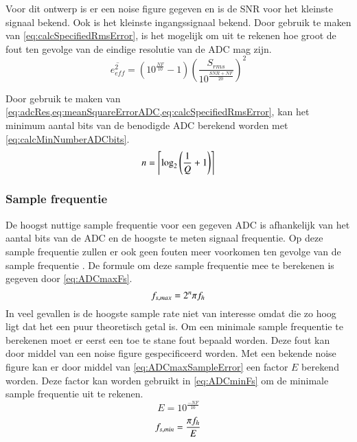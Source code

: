 Voor dit ontwerp is er een noise figure gegeven en is de SNR voor het kleinste signaal bekend. Ook is het kleinste ingangssignaal bekend. Door gebruik te maken van \cref{eq:calcSpecifiedRmsError}, is het mogelijk om uit te rekenen hoe groot de fout ten gevolge van de eindige resolutie van de ADC mag zijn.
\begin{equation}\label{eq:calcSpecifiedRmsError}
    \overline{e_{eff}^2}=\left(10^{\frac{NF}{10}}-1\right)\left(\frac{S_{rms}}{10^{\frac{SNR+NF}{20}}}\right)^2
\end{equation}

Door gebruik te maken van \cref{eq:adcRes,eq:meanSquareErrorADC,eq:calcSpecifiedRmsError}, kan het minimum aantal bits van de benodigde ADC berekend worden met \cref{eq:calcMinNumberADCbits}.
\begin{equation}\label{eq:calcMinNumberADCbits}
    n=\left\lceil\log_2\left(\frac{1}{Q}+1\right)\right\rceil
    \tagaddtext{[bits]}
\end{equation}

\subsubsection{Sample frequentie}\label{sec:ADC:sampleFreq}
De hoogst nuttige sample frequentie voor een gegeven ADC is afhankelijk van het aantal bits van de ADC en de hoogste te meten signaal frequentie. Op deze sample frequentie zullen er ook geen fouten meer voorkomen ten gevolge van de sample frequentie \cite{MJHcalcADC}. De formule om deze sample frequentie mee te berekenen is gegeven door \cref{eq:ADCmaxFs}.
\begin{equation}\label{eq:ADCmaxFs}
    f_{s,max}=2^n\pi f_h
    \tagaddtext{[\si{\hertz}]}
\end{equation}
In veel gevallen is de hoogste sample rate niet van interesse omdat die zo hoog ligt dat het een puur theoretisch getal is. Om een minimale sample frequentie te berekenen moet er eerst een toe te stane fout bepaald worden. Deze fout kan door middel van een noise figure gespecificeerd worden. Met een bekende noise figure kan er door middel van \cref{eq:ADCmaxSampleError} een factor $E$ berekend worden. Deze factor kan worden gebruikt in \cref{eq:ADCminFs} om de minimale sample frequentie uit te rekenen.
\begin{equation}\label{eq:ADCmaxSampleError}
    E=10^{\frac{-NF}{10}}
\end{equation}
\begin{equation}\label{eq:ADCminFs}
    f_{s,min}=\frac{\pi f_h}{E}
    \tagaddtext{[\si{\hertz}]}
\end{equation}